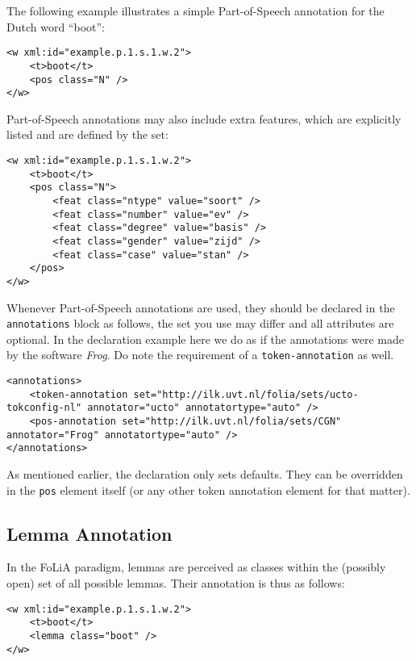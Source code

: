 \documentclass[a4paper,12pt]{article}
\begin{document}
The following example illustrates a simple Part-of-Speech annotation for the Dutch word ``boot'':

\begin{verbatim}
<w xml:id="example.p.1.s.1.w.2">
    <t>boot</t>
    <pos class="N" />
</w>
\end{verbatim}

Part-of-Speech annotations may also include extra features, which are explicitly listed and are defined by the set:

\begin{verbatim}
<w xml:id="example.p.1.s.1.w.2">
    <t>boot</t>
    <pos class="N">
        <feat class="ntype" value="soort" />
        <feat class="number" value="ev" />
        <feat class="degree" value="basis" />
        <feat class="gender" value="zijd" />
        <feat class="case" value="stan" />
    </pos>
</w>
\end{verbatim}

Whenever Part-of-Speech annotations are used, they should be declared in the \texttt{annotations} block as follows, the set you use may differ and all attributes are optional. In the declaration example here we do as if the annotations were made by the software \emph{Frog}. Do note the requirement of a \texttt{token-annotation} as well.

\begin{verbatim}
<annotations>
    <token-annotation set="http://ilk.uvt.nl/folia/sets/ucto-tokconfig-nl" annotator="ucto" annotatortype="auto" />
    <pos-annotation set="http://ilk.uvt.nl/folia/sets/CGN" annotator="Frog" annotatortype="auto" />
</annotations>
\end{verbatim}

As mentioned earlier, the declaration only sets defaults. They can be overridden in the \texttt{pos} element itself (or any other token annotation element for that matter).

\subsection{Lemma Annotation}

In the FoLiA paradigm, lemmas are perceived as classes within the (possibly open) set of all possible lemmas. Their annotation is thus as follows:

\begin{verbatim}
<w xml:id="example.p.1.s.1.w.2">
    <t>boot</t>
    <lemma class="boot" />
</w>
\end{verbatim}
\end{document}
